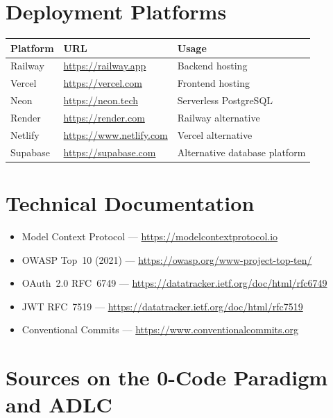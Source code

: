 \section{Deployment Platforms}

\begin{center}
\begin{tabularx}{\textwidth}{l X l}
\toprule
\textbf{Platform} & \textbf{URL} & \textbf{Usage} \\
\midrule
Railway & \url{https://railway.app} & Backend hosting \\
Vercel & \url{https://vercel.com} & Frontend hosting \\
Neon & \url{https://neon.tech} & Serverless PostgreSQL \\
Render & \url{https://render.com} & Railway alternative \\
Netlify & \url{https://www.netlify.com} & Vercel alternative \\
Supabase & \url{https://supabase.com} & Alternative database platform \\
\bottomrule
\end{tabularx}
\end{center}

\section{Technical Documentation}

\begin{itemize}
  \item Model Context Protocol --- \url{https://modelcontextprotocol.io}
  \item OWASP Top~10 (2021) --- \url{https://owasp.org/www-project-top-ten/}
  \item OAuth~2.0 RFC~6749 --- \url{https://datatracker.ietf.org/doc/html/rfc6749}
  \item JWT RFC~7519 --- \url{https://datatracker.ietf.org/doc/html/rfc7519}
  \item Conventional Commits --- \url{https://www.conventionalcommits.org}
\end{itemize}

\section{Sources on the 0-Code Paradigm and ADLC}

